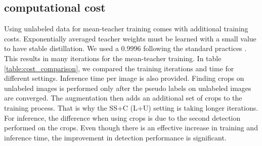 \subsection{computational cost}
Using unlabeled data for mean-teacher training comes with additional training costs. Exponentially averaged teacher weights must be learned with a small  value to have stable distillation. We used a 0.9996 following the standard practices \cite{unbiased-teacher-Liu-2021, humble-teacher-Yang-2021}. This results in many iterations for the mean-teacher training. In table \ref{table:cost_comparison}, we compared the training iterations and time for different settings. Inference time per image is also provided. Finding crops on unlabeled images is performed only after the pseudo labels on unlabeled images are converged. The augmentation then adds an additional set of crops to the training process. That is why the SS+C (L+U) setting is taking longer iterations. For inference, the difference when using crops is due to the second detection performed on the crops. Even though there is an effective increase in training and inference time, the improvement in detection performance is significant.

\begin{table}
    \caption{Comparison of the training and test time for fully supervised and semi-supervised methods with and without density crops. All settings are evaluated using one A100 GPU with the Visdrone dataset having 10\% labels.}
    \centering
    \label{table:cost_comparison}
\end{table}



